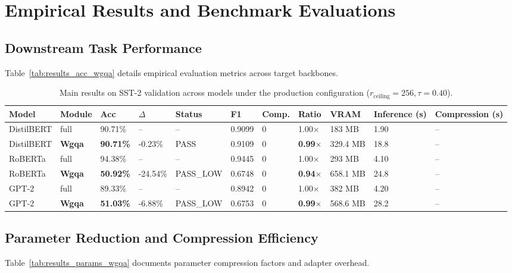 \section{Empirical Results and Benchmark Evaluations}

\subsection{Downstream Task Performance}
Table~\ref{tab:results_acc_wgqa} details empirical evaluation metrics across target backbones.

\begin{table}[t]
\centering
\small
\begin{tabular}{lllllllllll}
\toprule
\textbf{Model} & \textbf{Module} & \textbf{Acc} & \textbf{$\Delta$} & \textbf{Status} & \textbf{F1} & \textbf{Comp.} & \textbf{Ratio} & \textbf{VRAM} & \textbf{Inference (s)} & \textbf{Compression (s)} \\
\midrule
DistilBERT & full & 90.71\% & -- & -- & 0.9099 & 0 & 1.00$\times$ & 183 MB & 1.90 & -- \\
DistilBERT & \textbf{Wgqa} & \textbf{90.71\%} & -0.23\% & PASS & 0.9109 & 0 & \textbf{0.99$\times$} & 329.4 MB & 18.8 & -- \\
RoBERTa & full & 94.38\% & -- & -- & 0.9445 & 0 & 1.00$\times$ & 293 MB & 4.10 & -- \\
RoBERTa & \textbf{Wgqa} & \textbf{50.92\%} & -24.54\% & PASS_LOW & 0.6748 & 0 & \textbf{0.94$\times$} & 658.1 MB & 24.8 & -- \\
GPT-2 & full & 89.33\% & -- & -- & 0.8942 & 0 & 1.00$\times$ & 382 MB & 4.20 & -- \\
GPT-2 & \textbf{Wgqa} & \textbf{51.03\%} & -6.88\% & PASS_LOW & 0.6753 & 0 & \textbf{0.99$\times$} & 568.6 MB & 28.2 & -- \\
\bottomrule
\end{tabular}
\caption{Main results on SST-2 validation across models under the production configuration ($r_{\mathrm{ceiling}}=256, \tau=0.40$).}
\label{tab:main_sst2}
\end{table}

\subsection{Parameter Reduction and Compression Efficiency}
Table~\ref{tab:results_params_wgqa} documents parameter compression factors and adapter overhead.

